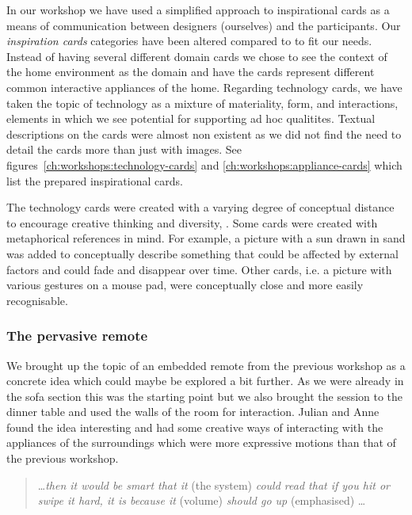 In our workshop we have used a simplified approach to inspirational cards as a means of communication between designers (ourselves) and the participants.
Our \emph{inspiration cards} categories have been altered compared to \citep{halskov2006inspiration} to fit our needs.
Instead of having several different domain cards we chose to see the context of the home environment as the domain and have the cards represent different common interactive appliances of the home.
Regarding technology cards, we have taken the topic of technology as a mixture of materiality, form, and interactions, elements in which we see potential for supporting ad hoc qualitites.
Textual descriptions on the cards were almost non existent as we did not find the need to detail the cards more than just with images.
See figures~\ref{ch:workshops:technology-cards} and \ref{ch:workshops:appliance-cards} which list the prepared inspirational cards.

The technology cards were created with a varying degree of conceptual distance to encourage creative thinking and diversity, \citep[chap. 10]{benyon2005designing}.
Some cards were created with metaphorical references in mind.
For example, a picture with a sun drawn in sand was added to conceptually describe something that could be affected by external factors and could fade and disappear over time.
Other cards, i.e. a picture with various gestures on a mouse pad, were conceptually close and more easily recognisable.

\subsubsection{The pervasive remote}

We brought up the topic of an embedded remote from the previous workshop as a concrete idea which could maybe be explored a bit further.
As we were already in the sofa section this was the starting point but we also brought the session to the dinner table and used the walls of the room for interaction.
Julian and Anne found the idea interesting and had some creative ways of interacting with the appliances of the surroundings which were more expressive motions than that of the previous workshop.

\begin{quotation}
\dots \emph{then it would be smart that it} (the system) \emph{could read that if you hit or swipe it hard, it is because it} (volume) \emph{should go up} (emphasised) \dots
\end{quotation}


